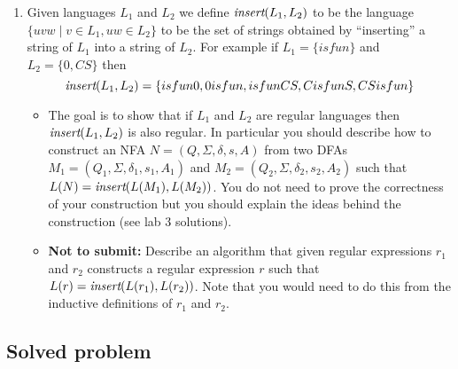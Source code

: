 \documentclass[11pt]{article}
\begin{document}
\begin{enumerate}
\item Given languages $L_1$ and $L_2$ we define $\text{\em insert}(L_1,L_2)$
to be the language $\{uvw \mid v \in L_1, uw \in L_2\}$ to be the
set of strings obtained by ``inserting'' a string of $L_1$ into a
string of $L_2$. For example if $L_1 = \{isfun\}$ and $L_2 = \{0, CS\}$
then
$$\text{\em insert}(L_1,L_2) = \{isfun0,0isfun,isfunCS,CisfunS,CSisfun\}$$
\begin{itemize}
\item The goal is to show that if $L_1$ and $L_2$ are regular
  languages then $\text{\em insert}(L_1,L_2)$ is also regular.  In
  particular you should describe how to construct an NFA $N =
  (Q,\Sigma, \delta,s, A)$ from two DFAs
  $M_1=(Q_1,\Sigma,\delta_1,s_1,A_1)$ and
  $M_2=(Q_2,\Sigma,\delta_2,s_2,A_2)$ such that $L(N) = \text{\em
    insert}(L(M_1),L(M_2))$. You do not need to prove the correctness of
  your construction but you should explain the ideas behind the
  construction (see lab 3 solutions).
\item {\bf Not to submit:} Describe an algorithm that given
  regular expressions $r_1$ and $r_2$ constructs a regular expression
  $r$ such that $L(r) =  \text{\em insert}(L(r_1),L(r_2))$. Note that you
  would need to do this from the inductive definitions of $r_1$ and $r_2$.
\end{itemize}


\end{enumerate}
\vspace{1in}
\subsection*{Solved problem}
\end{document}
